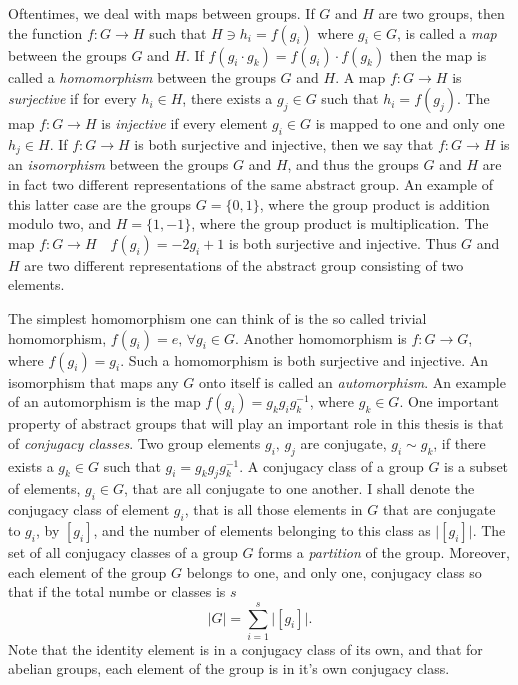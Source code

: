 \documentclass{article}
\newcommand\defn[1]{\textsl{#1}}
\begin{document}
Oftentimes, we deal with maps between groups.  If $G$ and $H$ are two groups, then the function $f: G\rightarrow H$ such that $H\ni h_i=f(g_i)$ where $g_i\in G$, is called a \defn{map} between the groups $G$ and $H$.   If $f(g_i\cdot g_k)=f(g_i)\cdot f(g_k)$ then the map is called a \defn{homomorphism} between the groups $G$ and $H$.  A map $f:G\rightarrow H$ is \defn{surjective} if for every $h_i\in H$, there exists a $g_j\in G$ such that $h_i=f(g_j)$.  The map $f:G\rightarrow H$ is \defn{injective} if every element $g_i\in G$ is mapped to one and only one $h_j\in H$.  If $f:G\rightarrow H$ is both surjective and injective, then we say that $f:G\rightarrow H$ is an \defn{isomorphism} between the groups $G$ and $H$, and thus the groups $G$ and $H$ are in fact two different representations of the same abstract group.  An example of this latter case are the groups $G=\{0,1\}$, where the group product is addition modulo two, and $H=\{1,-1\}$, where the group product is multiplication.  The map $f:G\rightarrow H\quad f(g_i)=-2g_i+1$ is both surjective and injective.  Thus $G$ and $H$ are  two different representations of the abstract group consisting of two elements.

The simplest homomorphism one can think of is the so called trivial homomorphism, $f(g_i)=e,\, \forall g_i\in G$.  Another homomorphism is $f: G\rightarrow G$, where $f(g_i)=g_i$.  Such a homomorphism is both surjective and injective.  An isomorphism that maps any $G$ onto itself is called an \defn{automorphism}.  An example of an automorphism is the map $f(g_i)=g_k g_i g_k^{-1}$, where $g_k\in G$. One important property of abstract groups that will play an important role in this thesis is that of \defn{conjugacy classes}.  Two group elements $g_i,\, g_j$ are conjugate, $g_i\sim g_k$, if there exists a $g_k\in G$ such that $g_i=g_k g_j g_k^{-1}$.  A conjugacy class of a group $G$ is a subset of elements, $g_i\in G$, that are all conjugate to one another.  I shall denote the conjugacy class of element $g_i$, that is all those elements in $G$ that are conjugate to $g_i$, by $[g_i]$, and the number of elements belonging to this class as $\lvert[g_i]\rvert$.  The set of all conjugacy classes of a group $G$ forms a \defn{partition} of the group.  Moreover, each element of the group $G$ belongs to one, and only one, conjugacy class so that if the total numbe or classes is $s$
\begin{equation}
\lvert G\rvert=\sum_{i=1}^s \lvert[g_i]\rvert.
\label{27}
\end{equation}
Note that the identity element is in a conjugacy class of its own, and that for abelian groups, each element of the group is in it's own conjugacy class.  
\end{document}
